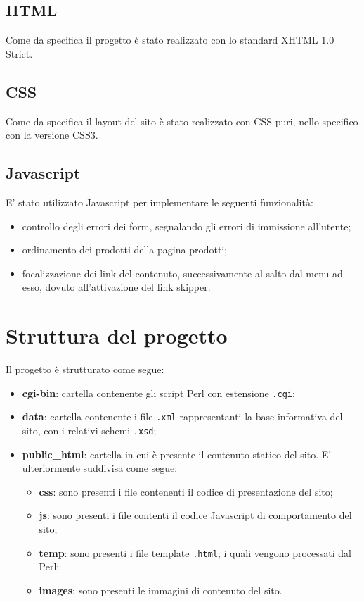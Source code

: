 	\subsection{HTML}
	Come da specifica il progetto è stato realizzato con lo standard XHTML 1.0 Strict.
	\subsection{CSS}
	Come da specifica il layout del sito è stato realizzato con CSS puri, nello specifico con la versione CSS3.
	\subsection{Javascript}
	E' stato utilizzato Javascript per implementare le seguenti funzionalità:
	\begin{itemize}
		\item controllo degli errori dei form, segnalando gli errori di immissione all'utente;
		\item ordinamento dei prodotti della pagina prodotti;
		\item focalizzazione dei link del contenuto, successivamente al salto dal menu ad esso, dovuto all'attivazione del link skipper.
	\end{itemize}
\section{Struttura del progetto}
	Il progetto è strutturato come segue:
	\begin{itemize}
		\item \textbf{cgi-bin}: cartella contenente gli script Perl con estensione \texttt{.cgi};
		\item \textbf{data}: cartella contenente i file \texttt{.xml} rappresentanti la base informativa del sito, con i relativi schemi \texttt{.xsd};
		\item \textbf{public\_html}: cartella in cui è presente il contenuto statico del sito. E' ulteriormente suddivisa come segue:
		\begin{itemize}
			\item \textbf{css}: sono presenti i file contenenti il codice di presentazione del sito;
			\item \textbf{js}: sono presenti i file contenti il codice Javascript di comportamento del sito;
			\item \textbf{temp}: sono presenti i file template \texttt{.html}, i quali vengono processati dal Perl;
			\item \textbf{images}: sono presenti le immagini di contenuto del sito.
		\end{itemize}
	\end{itemize}
